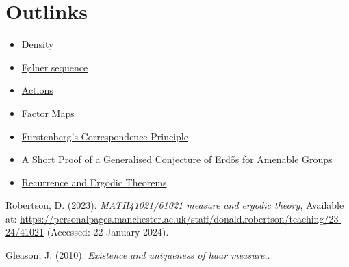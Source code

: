 \documentclass[
  british,
]{article}
\newlength{\cslhangindent}
\newenvironment{CSLReferences}[2] %
 {\begin{list}{}{%
  \setlength{\itemindent}{0pt}
  \setlength{\leftmargin}{0pt}
  \setlength{\parsep}{0pt}
  \ifodd #1
   \setlength{\leftmargin}{\cslhangindent}
   \setlength{\itemindent}{-1\cslhangindent}
  \fi
  \setlength{\itemsep}{#2\baselineskip}}}
 {\end{list}}
\providecommand{\tightlist}{%
  \setlength{\itemsep}{0pt}\setlength{\parskip}{0pt}}
\theoremstyle{definition}
\theoremstyle{remark}
\begin{document}
\section*{Outlinks}\label{sec-Outlinks}

\begin{itemize}
\tightlist
\item
  \href{../../MathsNotes/1_Amenable_and_Density/density.html}{Density}
\item
  \href{../../MathsNotes/1_Amenable_and_Density/folner.html}{Følner sequence}
\item
  \href{../../MathsNotes/2_Topological_Dynamics/actions.html}{Actions}
\item
  \href{../../MathsNotes/2_Topological_Dynamics/factor-maps.html}{Factor Maps}
\item
  \href{../../MathsNotes/2_Topological_Dynamics/furstenberg-correspondence.html}{Furstenberg's Correspondence Principle}
\item
  \href{../../GeneralisedErdosConjecture/ErdosConjecture.html}{A Short Proof of a Generalised Conjecture of Erdős for Amenable Groups}
\item
  \href{../../MathsNotes/2_Topological_Dynamics/recurrence-and-Ergodic-theorem.html}{Recurrence and Ergodic Theorems}
\end{itemize}

\label{refs}
\begin{CSLReferences}{1}{0}
Robertson, D. (2023). \textquotesingle{}\emph{MATH41021/61021 measure
and ergodic theory}\textquotesingle, Available at:
\url{https://personalpages.manchester.ac.uk/staff/donald.robertson/teaching/23-24/41021}
(Accessed: 22 January 2024).

Gleason, J. (2010). \textquotesingle{}\emph{Existence and uniqueness of
haar measure}\textquotesingle,.

\end{CSLReferences}
\end{document}
